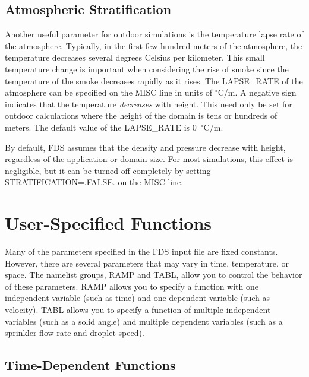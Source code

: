 \documentclass[11pt]{book}
\begin{document}
\section{Atmospheric Stratification}
\label{info:stratification}

Another useful parameter for outdoor simulations is the temperature
lapse rate of the atmosphere. Typically, in the first few hundred meters
of the atmosphere, the temperature decreases several degrees Celsius
per kilometer. This small temperature change is important when considering the rise
of smoke since the temperature of the smoke decreases rapidly as it
rises. The {\ct LAPSE\_RATE} of the atmosphere can be specified on the
{\ct MISC} line in units of $^\circ$C/m. A negative sign indicates that the
temperature {\em decreases} with height.
This need only be set for outdoor calculations where the height of the
domain is tens or hundreds of meters.
The default value of the {\ct LAPSE\_RATE} is 0~$^\circ$C/m.

By default, FDS assumes that the density and pressure decrease with height, regardless of the
application or domain size. For most simulations, this effect is negligible, but it can be
turned off completely by setting {\ct STRATIFICATION=.FALSE.} on the {\ct MISC} line.


\chapter{User-Specified Functions}
\label{info:RAMP}

Many of the parameters specified in the FDS input file are fixed constants. However, there are several parameters that may vary in
time, temperature, or space. The namelist groups,
{\ct RAMP} and {\ct TABL}, allow you to control the behavior of these parameters.  {\ct RAMP} allows you
to specify a function with one independent variable (such as time) and one dependent variable (such as velocity).
{\ct TABL} allows you to specify a function of multiple independent variables (such as a solid angle) and multiple
dependent variables (such as a sprinkler flow rate and droplet speed).



\section{Time-Dependent Functions}
\label{info:RAMP_Time}
\end{document}
